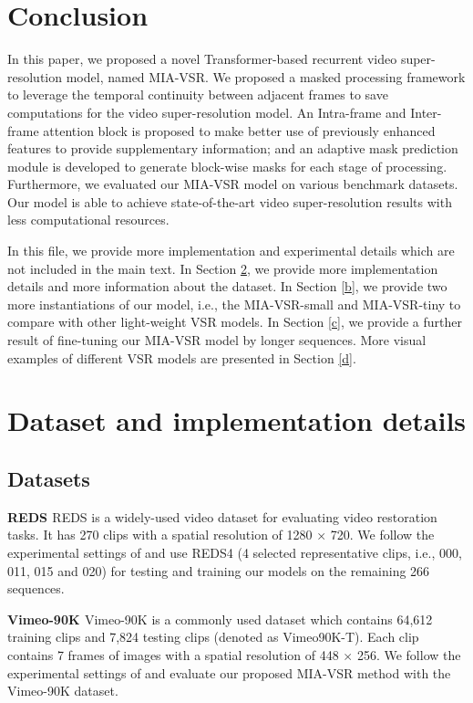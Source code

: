 \documentclass[10pt,twocolumn,letterpaper]{article}
\begin{document}
\section{Conclusion}
In this paper, we proposed a novel Transformer-based recurrent
video super-resolution model, named MIA-VSR.
%
We proposed a masked processing framework to leverage the temporal continuity between adjacent frames to save computations for the video super-resolution model.
%
An Intra-frame and Inter-frame attention block is proposed to make better use of previously enhanced features to provide supplementary information; 
and an adaptive mask prediction module is developed to generate block-wise masks for each stage of processing.
%
Furthermore, we evaluated our MIA-VSR model on various benchmark datasets.
%
Our model is able to achieve state-of-the-art video super-resolution results with less computational resources.
% 
{
    \small
    
    
}
\clearpage
\maketitlesupplementary
\appendix
In this file, we provide more implementation and experimental details which are not included in the main text. 
%
In Section \ref{a}, we provide more implementation details and more information about the dataset.
%
In Section \ref{b}, we provide two more instantiations of our model, i.e., the MIA-VSR-small and MIA-VSR-tiny to compare with other light-weight VSR models.
%
In Section \ref{c}, we provide a further result of fine-tuning our MIA-VSR model by longer sequences. 
%
More visual examples of different VSR models are presented in Section \ref{d}.


\section{Dataset and implementation details}\label{a}
\subsection{Datasets}
\textbf{REDS \cite{nah2019ntire}}
REDS is a widely-used video dataset for evaluating video restoration tasks.
%
It has 270 clips with a spatial resolution of 1280 × 720. 
%
We follow the experimental settings of \cite{chan2020basicvsr,chan2022basicvsr++,shi2022rethinking} and use REDS4 (4 selected representative
clips, i.e., 000, 011, 015 and 020) for testing and training our models on the remaining 266 sequences.

\vspace{3mm}
\noindent
\textbf{Vimeo-90K \cite{xue2019video}} Vimeo-90K is a commonly used dataset which contains 64,612 training clips and 7,824 testing clips (denoted as Vimeo90K-T).
%
Each clip contains 7 frames of images with a spatial resolution of 448 $\times$ 256.
%
We follow the experimental settings of \cite{chan2020basicvsr,chan2022basicvsr++,shi2022rethinking} and evaluate our proposed MIA-VSR method with the Vimeo-90K dataset.
\end{document}
